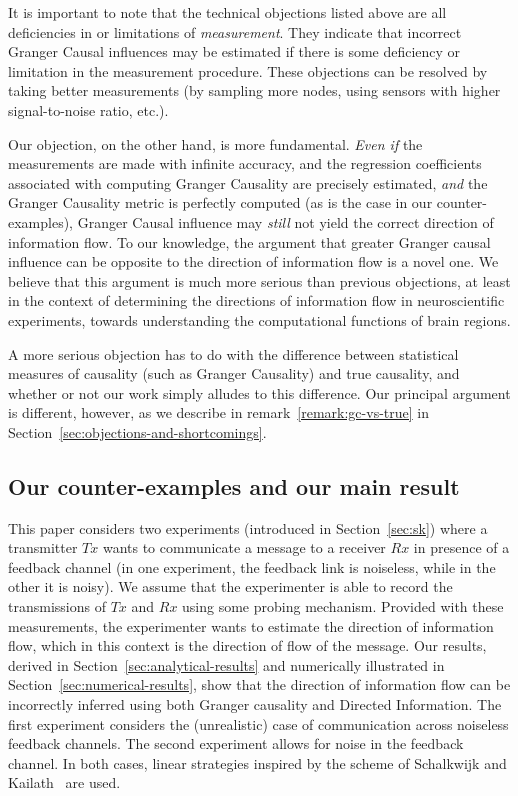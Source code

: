 \documentclass[letterpaper, 10pt, conference]{ieeeconf}
\begin{document}
It is important to note that the technical objections listed above are all deficiencies in or limitations of \emph{measurement}. They indicate that incorrect Granger Causal influences may be estimated if there is some deficiency or limitation in the measurement procedure. These objections can be resolved by taking better measurements (by sampling more nodes, using sensors with higher signal-to-noise ratio, etc.).

Our objection, on the other hand, is more fundamental. \emph{Even if} the measurements are made with infinite accuracy, and the regression coefficients associated with computing Granger Causality are precisely estimated, \emph{and} the Granger Causality metric is perfectly computed (as is the case in our counter-examples), Granger Causal influence may \emph{still} not yield the correct direction of information flow. To our knowledge, the argument that greater Granger causal influence can be opposite to the direction of information flow is a novel one. We believe that this argument is much more serious than previous objections, at least in the context of determining the directions of information flow in neuroscientific experiments, towards understanding the computational functions of brain regions.

A more serious objection has to do with the difference between statistical measures of causality (such as Granger Causality) and true causality, and whether or not our work simply alludes to this difference. Our principal argument is different, however, as we describe in remark~\ref{remark:gc-vs-true} in Section~\ref{sec:objections-and-shortcomings}.


\subsection{Our counter-examples and our main result}
\label{sec:our-counterexamples}

This paper considers two experiments (introduced in Section~\ref{sec:sk}) where a transmitter $Tx$ wants to communicate a message to a receiver $Rx$ in presence of a feedback channel (in one experiment, the feedback link is noiseless, while in the other it is noisy). We assume that the experimenter is able to record the transmissions of $Tx$ and $Rx$ using some probing mechanism. Provided with these measurements, the experimenter wants to estimate the direction of information flow, which in this context is the direction of flow of the message. Our results, derived in Section~\ref{sec:analytical-results} and numerically illustrated in Section~\ref{sec:numerical-results}, show that the direction of information flow can be incorrectly inferred using both Granger causality and Directed Information. The first experiment considers the (unrealistic) case of communication across noiseless feedback channels. The second experiment allows for noise in the feedback channel. In both cases, linear strategies inspired by the scheme of Schalkwijk and Kailath~\cite{S&K} are used.
\end{document}
